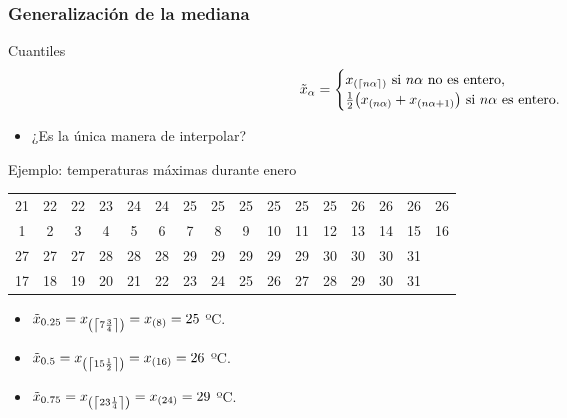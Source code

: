 \documentclass[table]{beamer}
\begin{document}
\begin{frame}
    \frametitle{Generalización de la mediana}
    \begin{block}{Cuantiles}
        \begin{equation*}
            \tilde{x}_{\alpha} =
            \begin{cases}
                x_{\parens{\left \lceil n \alpha \right \rceil}} \text{ si } n \alpha \text{ no es entero} , \\
                \frac{1}{2} \parens{x_{\parens{n \alpha}} + x_{\parens{n \alpha + 1}}} \text{ si } n \alpha \text{ es entero} .
            \end{cases}
        \end{equation*}
        \begin{itemize}
            \item ¿Es la única manera de interpolar?
        \end{itemize}
    \end{block}
    \begin{exampleblock}{Ejemplo: temperaturas máximas durante enero}
            \begin{center}
                \footnotesize
                \begin{tabular}{cccccccccccccccc}
                    21 & 22 & 22 & 23 & 24 & 24 & 25 & 25 & 25 & 25 & 25 & 25 & 26 & 26 & 26 & 26 \\
                    1 & 2 & 3 & 4 & 5 & 6 & 7 & 8 & 9 & 10 & 11 & 12 & 13 & 14 & 15 & 16 \\
                    \hline
                    27 & 27 & 27 & 28 & 28 & 28 & 29 & 29 & 29 & 29 & 29 & 30 & 30 & 30 & 31 & \\
                    17 & 18 & 19 & 20 & 21 & 22 & 23 & 24 & 25 & 26 & 27 & 28 & 29 & 30 & 31 & \\
                \end{tabular}
            \end{center}
        \begin{itemize}
            \item $\tilde{x}_{0.25} = x_{\parens{\left \lceil 7 \frac{3}{4} \right \rceil}} = x_{\parens{8}} = 25$ ºC.
            \item $\tilde{x}_{0.5} = x_{\parens{\left \lceil 15 \frac{1}{2} \right \rceil}} = x_{\parens{16}} = 26$ ºC.
            \item $\tilde{x}_{0.75} = x_{\parens{\left \lceil 23 \frac{1}{4} \right \rceil}} = x_{\parens{24}} = 29$ ºC.
        \end{itemize}
    \end{exampleblock}
\end{frame}
\end{document}
